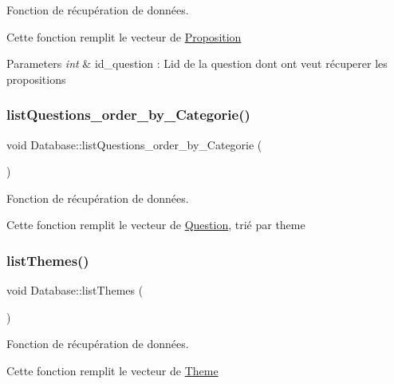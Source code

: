 Fonction de récupération de données. 

Cette fonction remplit le vecteur de \mbox{\hyperlink{classProposition}{Proposition}} 
\begin{DoxyParams}{Parameters}
{\em int} & id\+\_\+question \+: L\textquotesingle{}id de la question dont ont veut récuperer les propositions \\
\hline
\end{DoxyParams}
\mbox{\label{classDatabase_ae5bacbdc2d6804c63d79cdafc249dd64}} 
\subsubsection{\texorpdfstring{list\+Questions\+\_\+order\+\_\+by\+\_\+\+Categorie()}{listQuestions\_order\_by\_Categorie()}}
{\footnotesize\ttfamily void Database\+::list\+Questions\+\_\+order\+\_\+by\+\_\+\+Categorie (\begin{DoxyParamCaption}{ }\end{DoxyParamCaption})}



Fonction de récupération de données. 

Cette fonction remplit le vecteur de \mbox{\hyperlink{classQuestion}{Question}}, trié par theme \mbox{\label{classDatabase_a725966780835e8a3c1315fbdce50258f}} 
\subsubsection{\texorpdfstring{list\+Themes()}{listThemes()}}
{\footnotesize\ttfamily void Database\+::list\+Themes (\begin{DoxyParamCaption}{ }\end{DoxyParamCaption})}



Fonction de récupération de données. 

Cette fonction remplit le vecteur de \mbox{\hyperlink{classTheme}{Theme}} \mbox{\label{classDatabase_adf142a6306d28877edca6de39a4b7bc1}} 
